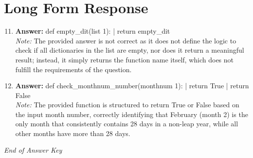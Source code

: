\documentclass[12pt]{article}
\begin{document}
\section*{Long Form Response}
\begin{enumerate}[label=\arabic*.]
\setcounter{enumi}{10}
\item \textbf{Answer:} def empty\_dit(list 1): | return empty\_dit
\\ \textit{Note:} The provided answer is not correct as it does not define the logic to check if all dictionaries in the list are empty, nor does it return a meaningful result; instead, it simply returns the function name itself, which does not fulfill the requirements of the question.
\item \textbf{Answer:} def check\_monthnum\_number(monthnum 1): | return True | return False
\\ \textit{Note:} The provided function is structured to return True or False based on the input month number, correctly identifying that February (month 2) is the only month that consistently contains 28 days in a non-leap year, while all other months have more than 28 days.
\end{enumerate}

\vfill
\noindent\textit{End of Answer Key}
\end{document}
